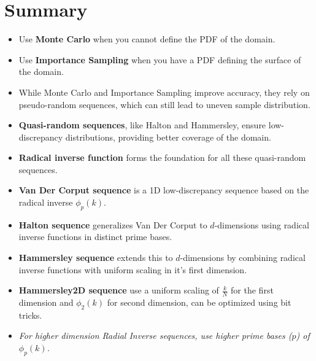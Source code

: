 \documentclass{article}
\begin{document}
\section{Summary}
\begin{itemize}
	\item Use \textbf{Monte Carlo} when you cannot define the PDF of the domain.
	\item Use \textbf{Importance Sampling} when you have a PDF defining the surface of the domain.
	\item While Monte Carlo and Importance Sampling improve accuracy, they rely on pseudo-random sequences, which can still lead to uneven sample distribution. 
	\item \textbf{Quasi-random sequences}, like Halton and Hammersley, ensure low-discrepancy distributions, providing better coverage of the domain.
	\item \textbf{Radical inverse function} forms the foundation for all these quasi-random sequences.
	\item \textbf{Van Der Corput sequence} is a 1D low-discrepancy sequence based on the radical inverse $\phi_p(k)$. 
	\item \textbf{Halton sequence} generalizes Van Der Corput to $d$-dimensions using radical inverse functions in distinct prime bases.	
	\item \textbf{Hammersley sequence} extends this to $d$-dimensions by combining radical inverse functions with uniform scaling in it's first dimension.
	\item \textbf{Hammersley2D sequence} use a uniform scaling of $\frac{k}{N}$ for the first dimension and $\phi_2(k)$ for second dimension, can be optimized using bit tricks.
	\item \textit{For higher dimension Radial Inverse sequences, use higher prime bases ($p$) of $\phi_p(k)$.}
\end{itemize}
\end{document}
